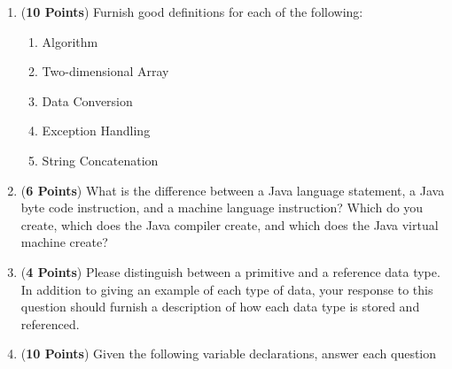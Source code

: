 \documentclass[12pt]{article}
\begin{document}
\begin{enumerate}

  \item ({\bf 10 Points}) Furnish good definitions for each of the following:

\begin{enumerate}

\item Algorithm
  \vspace*{1.2in}

\item Two-dimensional Array 
  \vspace*{1.2in}

\item Data Conversion 
  \vspace*{1.2in}

\item Exception Handling 
  \vspace*{1.2in}

\item String Concatenation
  \vspace*{1.2in}

\end{enumerate}



\newpage

\item ({\bf 6 Points}) What is the difference between a Java language statement, a Java byte code instruction, and a
  machine language instruction?  Which do you create, which does the Java compiler create, and which does the Java
  virtual machine create?
  \vspace*{4in}

\item ({\bf 4 Points}) Please distinguish between a primitive and a reference data type.  In addition to giving an
  example of each type of data,  your response to this question should furnish a description of how each data type is
  stored and referenced.  
  
  \newpage

\item ({\bf 10 Points}) Given the following variable declarations, answer each question


\end{enumerate}
\end{document}
